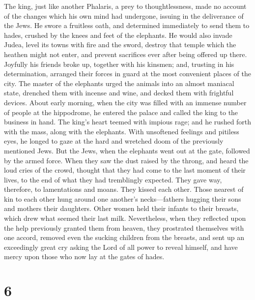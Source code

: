  The king, just like another Phalaris, a prey to
thoughtlessness, made no account of the changes which his own mind had
undergone, issuing in the deliverance of the Jews. He swore a fruitless
oath, and determined immediately to send them to hades, crushed by the
knees and feet of the elephants.  He would also invade
Judea, level its towns with fire and the sword, destroy that temple
which the heathen might not enter, and prevent sacrifices ever after
being offered up there.  Joyfully his friends broke up,
together with his kinsmen; and, trusting in his determination, arranged
their forces in guard at the most convenient places of the city.
 The master of the elephants urged the animals into an
almost maniacal state, drenched them with incense and wine, and decked
them with frightful devices.  About early morning, when
the city was filled with an immense number of people at the hippodrome,
he entered the palace and called the king to the business in hand.
 The king's heart teemed with impious rage; and he rushed
forth with the mass, along with the elephants. With unsoftened feelings
and pitiless eyes, he longed to gaze at the hard and wretched doom of
the previously mentioned Jews.  But the Jews, when the
elephants went out at the gate, followed by the armed force. When they
saw the dust raised by the throng, and heard the loud cries of the
crowd,  thought that they had come to the last moment of
their lives, to the end of what they had tremblingly expected. They gave
way, therefore, to lamentations and moans. They kissed each other. Those
nearest of kin to each other hung around one another's necks---fathers
hugging their sons and mothers their daughters. Other women held their
infants to their breasts, which drew what seemed their last milk.
 Nevertheless, when they reflected upon the help
previously granted them from heaven, they prostrated themselves with one
accord, removed even the sucking children from the breasts, and
 sent up an exceedingly great cry asking the Lord of all
power to reveal himself, and have mercy upon those who now lay at the
gates of hades.

\hypertarget{section-5}{%
\section{6}\label{section-5}}

